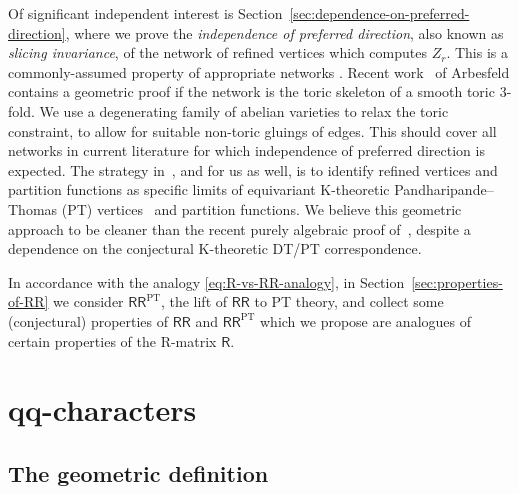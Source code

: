 \documentclass[pdftex]{sigma}%
\numberwithin{equation}{section}
\newcommand{\sR}{\mathsf{R}}
\newcommand{\sRR}{\mathsf{RR}}
\DeclareMathOperator{\PT}{PT}
\begin{document}
Of significant independent interest is
Section~\ref{sec:dependence-on-preferred-direction}, where we prove the {\it
 independence of preferred direction}, also known as {\it slicing
 invariance}, of the network of refined vertices which computes
$Z_r$. This is a commonly-assumed property of appropriate networks
\cite{Awata2013, Iqbal2009, Morozov2016}. Recent work~\cite{Arbesfeld2021} of Arbesfeld contains a geometric proof if the
network is the toric skeleton of a smooth toric $3$-fold. We use a
degenerating family of abelian varieties to relax the toric
constraint, to allow for suitable non-toric gluings of edges. This
should cover all networks in current literature for which independence
of preferred direction is expected. The strategy in~\cite{Arbesfeld2021}, and for us as well, is to identify refined
vertices and partition functions as specific limits of equivariant
K-theoretic Pandharipande--Thomas (PT) vertices~\cite{Pandharipande2009} and partition functions. We believe this
geometric approach to be cleaner than the recent purely algebraic
proof of~\cite{Fukuda2020}, despite a dependence on the conjectural
K-theoretic DT/PT correspondence.

In accordance with
the analogy \eqref{eq:R-vs-RR-analogy}, in
Section~\ref{sec:properties-of-RR} we consider $\sRR^{\PT}$, the lift of
$\sRR$ to PT theory, and collect some (conjectural) properties of
$\sRR$ and $\sRR^{\PT}$ which we propose are analogues of certain
properties of the R-matrix $\sR$.

\section[qq-characters]{$\boldsymbol{qq}$-characters}\label{sec:qq-characters}

\subsection{The geometric definition}
\end{document}
